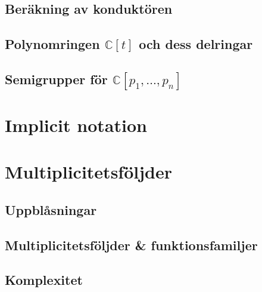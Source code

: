 \documentclass{beamer}
\begin{document}
\begin{frame}
	\frametitle{}
\end{frame}


\subsection{Beräkning av konduktören}
\subsection{Polynomringen $\mathbb{C}[t]$ och dess delringar}
\subsection{Semigrupper för $\mathbb{C}[p_1,\ldots,p_n]$}

\section{Implicit notation}

\section{Multiplicitetsföljder}
\subsection{Uppblåsningar}
\subsection{Multiplicitetsföljder \& funktionsfamiljer}
\subsection{Komplexitet}
\end{document}
